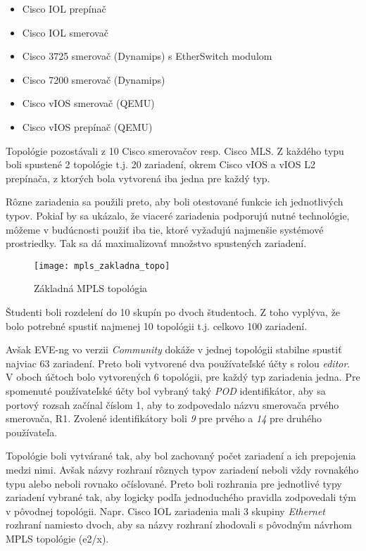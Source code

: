 \begin{itemize}[noitemsep]
    \item Cisco IOL prepínač
    \item Cisco IOL smerovač
    \item Cisco 3725 smerovač (Dynamips) s EtherSwitch modulom
    \item Cisco 7200 smerovač (Dynamips)
    \item Cisco vIOS smerovač (QEMU)
    \item Cisco vIOS prepínač (QEMU)
\end{itemize}

Topológie pozostávali z 10 Cisco smerovačov resp. Cisco MLS. Z každého typu boli spustené 2 topológie t.j. 20 zariadení, okrem Cisco vIOS a vIOS L2 prepínača, z ktorých bola vytvorená iba jedna pre každý typ. 

Rôzne zariadenia sa použili preto, aby boli otestované funkcie ich jednotlivých typov. Pokiaľ by sa ukázalo, že viaceré zariadenia podporujú nutné technológie, môžeme v budúcnosti použiť iba tie, ktoré vyžadujú najmenšie systémové prostriedky. Tak sa dá maximalizovať množstvo spustených zariadení.


\begin{figure}
    \centering
    \texttt{[image: mpls\_zakladna\_topo]}
    \caption{Základná MPLS topológia}
    \label{obr:mpls_zakladna_topo}
    \cite{mpls_zakladna_topo}
\end{figure}

Študenti boli rozdelení do 10 skupín po dvoch študentoch. Z toho vyplýva, že bolo potrebné spustiť najmenej 10 topológii t.j. celkovo 100 zariadení.

Avšak EVE-ng vo verzii \emph{Community} dokáže v jednej topológii stabilne spustiť najviac 63 zariadení. Preto boli vytvorené dva používateľské účty s rolou \emph{editor}. V oboch účtoch bolo vytvorených 6 topológii, pre každý typ zariadenia jedna. Pre spomenuté používateľské účty bol vybraný taký \emph{POD} identifikátor, aby sa portový rozsah začínal číslom 1, aby to zodpovedalo názvu smerovača prvého smerovača, R1. Zvolené identifikátory boli \emph{9} pre prvého a \emph{14} pre druhého používateľa.

Topológie boli vytvárané tak, aby bol zachovaný počet zariadení a ich prepojenia medzi nimi. Avšak názvy rozhraní rôznych typov zariadení neboli vždy rovnakého typu alebo neboli rovnako očíslované. Preto boli rozhrania pre jednotlivé typy zariadení vybrané tak, aby logicky podľa jednoduchého pravidla zodpovedali tým v pôvodnej topológii. Napr. Cisco IOL zariadenia mali 3 skupiny \emph{Ethernet} rozhraní namiesto dvoch, aby sa názvy rozhraní zhodovali s pôvodným návrhom MPLS topológie (e2/x).

